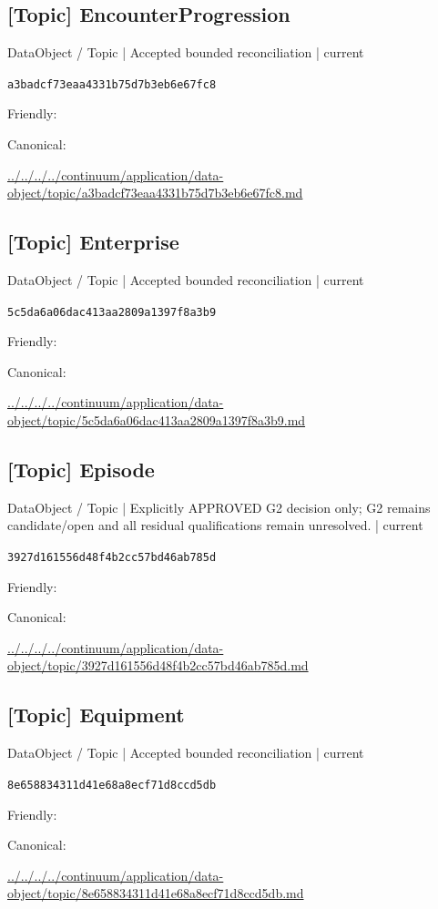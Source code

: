 \documentclass[10pt,a4paper]{article}
\begin{document}
\subsection*{[Topic] EncounterProgression}
{\small DataObject / Topic | Accepted bounded reconciliation | current}\par
\texttt{a3badcf73eaa4331b75d7b3eb6e67fc8}\par
Friendly: \par
Canonical: \par
{\footnotesize\url{../../../../continuum/application/data-object/topic/a3badcf73eaa4331b75d7b3eb6e67fc8.md}}\par
\subsection*{[Topic] Enterprise}
{\small DataObject / Topic | Accepted bounded reconciliation | current}\par
\texttt{5c5da6a06dac413aa2809a1397f8a3b9}\par
Friendly: \par
Canonical: \par
{\footnotesize\url{../../../../continuum/application/data-object/topic/5c5da6a06dac413aa2809a1397f8a3b9.md}}\par
\subsection*{[Topic] Episode}
{\small DataObject / Topic | Explicitly APPROVED G2 decision only; G2 remains candidate/open and all residual qualifications remain unresolved. | current}\par
\texttt{3927d161556d48f4b2cc57bd46ab785d}\par
Friendly: \par
Canonical: \par
{\footnotesize\url{../../../../continuum/application/data-object/topic/3927d161556d48f4b2cc57bd46ab785d.md}}\par
\subsection*{[Topic] Equipment}
{\small DataObject / Topic | Accepted bounded reconciliation | current}\par
\texttt{8e658834311d41e68a8ecf71d8ccd5db}\par
Friendly: \par
Canonical: \par
{\footnotesize\url{../../../../continuum/application/data-object/topic/8e658834311d41e68a8ecf71d8ccd5db.md}}\par
\end{document}
